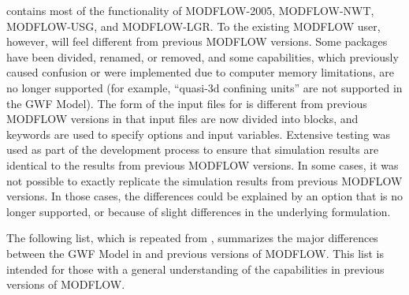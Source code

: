 \mf contains most of the functionality of MODFLOW-2005, MODFLOW-NWT, MODFLOW-USG, and MODFLOW-LGR.  To the existing MODFLOW user, however, \mf will feel different from previous MODFLOW versions.  Some packages have been divided, renamed, or removed, and some capabilities, which previously caused confusion or were implemented due to computer memory limitations, are no longer supported (for example, ``quasi-3d confining units'' are not supported in the GWF Model).  The form of the input files for \mf is different from previous MODFLOW versions in that input files are now divided into blocks, and keywords are used to specify options and input variables.  Extensive testing was used as part of the development process to ensure that \mf simulation results are identical to the results from previous MODFLOW versions.  In some cases, it was not possible to exactly replicate the simulation results from previous MODFLOW versions.  In those cases, the differences could be explained by an option that is no longer supported, or because of slight differences in the underlying formulation.  

The following list, which is repeated from \cite{modflow6gwf}, summarizes the major differences between the GWF Model in \mf and previous versions of MODFLOW.  This list is intended for those with a general understanding of the capabilities in previous versions of MODFLOW.

